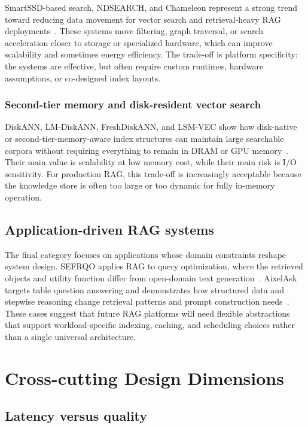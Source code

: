 \documentclass[acmsmall,screen]{acmart}
\begin{document}
SmartSSD-based search, NDSEARCH, and Chameleon represent a strong trend toward reducing data movement for vector search and retrieval-heavy RAG deployments~\cite{smartssd2024,ndsearch2024,chameleon2025}. These systems move filtering, graph traversal, or search acceleration closer to storage or specialized hardware, which can improve scalability and sometimes energy efficiency. The trade-off is platform specificity: the systems are effective, but often require custom runtimes, hardware assumptions, or co-designed index layouts.

\subsubsection{Second-tier memory and disk-resident vector search}

DiskANN, LM-DiskANN, FreshDiskANN, and LSM-VEC show how disk-native or second-tier-memory-aware index structures can maintain large searchable corpora without requiring everything to remain in DRAM or GPU memory~\cite{diskann2019,lmdiskann2023,freshdiskann2021,lsmvec2025}. Their main value is scalability at low memory cost, while their main risk is I/O sensitivity. For production RAG, this trade-off is increasingly acceptable because the knowledge store is often too large or too dynamic for fully in-memory operation.

\subsection{Application-driven RAG systems}

The final category focuses on applications whose domain constraints reshape system design. SEFRQO applies RAG to query optimization, where the retrieved objects and utility function differ from open-domain text generation~\cite{sefrqo2026}. AixelAsk targets table question answering and demonstrates how structured data and stepwise reasoning change retrieval patterns and prompt construction needs~\cite{aixelask2026}. These cases suggest that future RAG platforms will need flexible abstractions that support workload-specific indexing, caching, and scheduling choices rather than a single universal architecture.

\section{Cross-cutting Design Dimensions}

\subsection{Latency versus quality}
\end{document}
